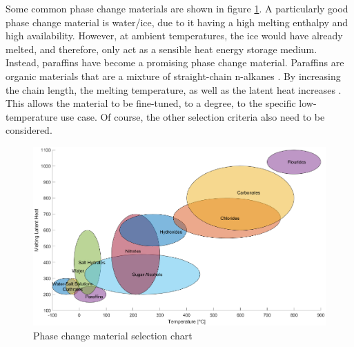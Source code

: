 Some common phase change materials are shown in figure \ref{fig:pcm_selection}. A particularly good phase change material is water/ice, due to it having a high melting enthalpy and high availability. However, at ambient temperatures, the ice would have already melted, and therefore, only act as a sensible heat energy storage medium. Instead, paraffins have become a promising phase change material. Paraffins are organic materials that are a mixture of straight-chain n-alkanes \cite{Reza_Vakhshouri_2020}. By increasing the chain length, the melting temperature, as well as the latent heat increases \cite{Reza_Vakhshouri_2020}. This allows the material to be fine-tuned, to a degree, to the specific low-temperature use case. Of course, the other selection criteria also need to be considered.
\begin{figure}[ht]
    \centering
    \includegraphics[width=0.8\linewidth]{figures/chapter_3/PCMs.eps}
    \caption{Phase change material selection chart \cite{Cabeza_Martorell_Miró_Fernández_Barreneche_Cabeza_Fernández_Barreneche_2021}}
    \label{fig:pcm_selection}
\end{figure}


